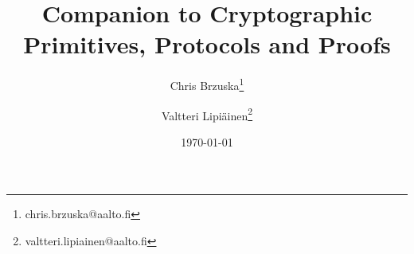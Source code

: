 \title{Companion to Cryptographic Primitives, Protocols and Proofs}
\author{Chris Brzuska\thanks{chris.brzuska@aalto.fi} }
\author{Valtteri Lipiäinen\thanks{valtteri.lipiainen@aalto.fi} }
\date{\today}